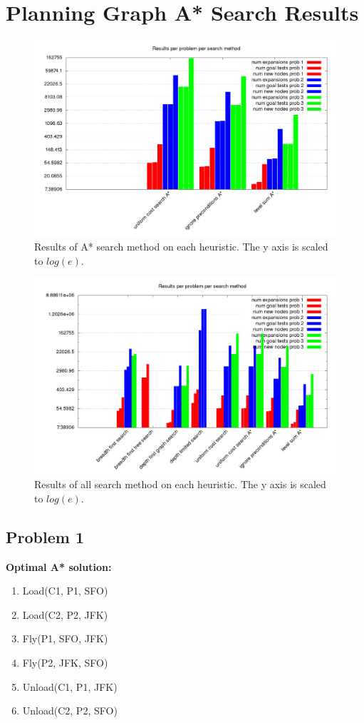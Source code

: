 \documentclass[11pt]{article}
\begin{document}
\section{Planning Graph A* Search Results}
\begin{figure}[H]
	\includegraphics[scale=0.32]{pg_results_summary.png}
	\caption{Results of A* search method on each heuristic. The y axis is scaled to $log(e)$.}
	\label{a_star_results_summary}
\end{figure}

\begin{figure}[H]
	\includegraphics[scale=0.32]{complete_results_summary.png}
	\caption{Results of all search method on each heuristic. The y axis is scaled to $log(e)$.}
	\label{complete_results_summary}
\end{figure}

\subsection{Problem 1}
\textbf{Optimal A* solution:}
\begin{enumerate}
	\item Load(C1, P1, SFO)
	\item Load(C2, P2, JFK)
	\item Fly(P1, SFO, JFK)
	\item Fly(P2, JFK, SFO)
	\item Unload(C1, P1, JFK)
	\item Unload(C2, P2, SFO)
\end{enumerate}
\end{document}
